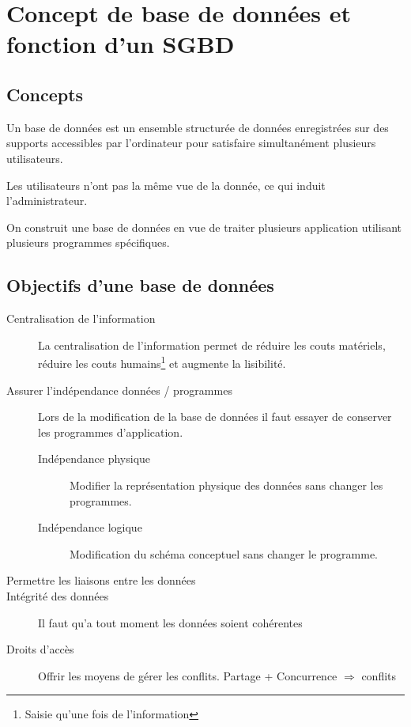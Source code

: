 \documentclass[12pt,a4paper,openany]{book}
\newcommand{\bd}{base de données}
\begin{document}
	\thispagestyle{empty} %
	\titleBC 
	\dominitoc
	\setcounter{tocdepth}{1}
	\setcounter{secnumdepth}{3}
	\setcounter{minitocdepth}{1}
	\tableofcontents
\chapter{Concept de base de données et fonction d'un SGBD}
	\section{Concepts}
	\begin{definition}
		Un base de données est un ensemble structurée de données enregistrées sur des supports accessibles par l'ordinateur pour satisfaire
		simultanément plusieurs utilisateurs.
	\end{definition}

	Les utilisateurs n'ont pas la même vue de la donnée, ce qui induit l'administrateur.
	\begin{remarque}
		On construit une \bd{} en vue de traiter plusieurs application utilisant plusieurs programmes spécifiques. 
	\end{remarque}

	\section{Objectifs d'une \bd{}}
		\begin{description}
			\item[Centralisation de l'information] La centralisation de l'information permet de réduire les couts matériels, réduire les couts humains\footnote{Saisie qu'une fois de l'information} et augmente la lisibilité.
			\item[Assurer l'indépendance données / programmes] Lors de la modification de la \bd{} il faut essayer de conserver les programmes d'application.
			\begin{description}
				\item[Indépendance physique] Modifier la représentation physique des données sans changer les programmes.
				\item[Indépendance logique] Modification du schéma conceptuel sans changer le programme.
			\end{description}
			\item[Permettre les liaisons entre les données] 
			\item[Intégrité des données] Il faut qu'a tout moment les données soient cohérentes
			\item[Droits d'accès] Offrir les moyens de gérer les conflits. Partage + Concurrence $\Rightarrow$ conflits
		\end{description}
	
\end{document}
